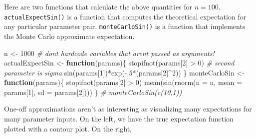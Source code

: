 \documentclass[
  12pt,
  krantz2]{krantz}
\makeatletter
\newenvironment{Shaded}{\begin{snugshade}}{\end{snugshade}}
\newcommand{\AttributeTok}[1]{\textcolor[rgb]{0.61,0.61,0.61}{#1}}
\newcommand{\CommentTok}[1]{\textcolor[rgb]{0.37,0.37,0.37}{\textit{#1}}}
\newcommand{\ControlFlowTok}[1]{\textcolor[rgb]{0.27,0.27,0.27}{\textbf{#1}}}
\newcommand{\DecValTok}[1]{\textcolor[rgb]{0.06,0.06,0.06}{#1}}
\newcommand{\FunctionTok}[1]{\textcolor[rgb]{0,0,0}{#1}}
\newcommand{\NormalTok}[1]{#1}
\newcommand{\OtherTok}[1]{\textcolor[rgb]{0.37,0.37,0.37}{#1}}
\newcommand{\SpecialCharTok}[1]{\textcolor[rgb]{0,0,0}{#1}}
\newenvironment{kframe}{%
\medskip{}
\setlength{\fboxsep}{.8em}
 \def\at@end@of@kframe{}%
 \ifinner\ifhmode%
  \def\at@end@of@kframe{\end{minipage}}%
  \begin{minipage}{\columnwidth}%
 \fi\fi%
 \def\FrameCommand##1{\hskip\@totalleftmargin \hskip-\fboxsep
 \colorbox{shadecolor}{##1}\hskip-\fboxsep
     \hskip-\linewidth \hskip-\@totalleftmargin \hskip\columnwidth}%
 \MakeFramed {\advance\hsize-\width
   \@totalleftmargin\z@ \linewidth\hsize
   \@setminipage}}%
 {\par\unskip\endMakeFramed%
 \at@end@of@kframe}
\renewenvironment{Shaded}{\begin{kframe}}{\end{kframe}}
\makeatother
\begin{document}
Here are two functions that calculate the above quantities for \(n=100\). \texttt{actualExpectSin()} is a function that computes the theoretical expectation for any particular parameter pair. \texttt{monteCarloSin()} is a function that implements the Monte Carlo approximate expectation.

\begin{Shaded}
\begin{Highlighting}[]
\NormalTok{n }\OtherTok{\textless{}{-}} \DecValTok{1000} \CommentTok{\# don\textquotesingle{}t hardcode variables that aren\textquotesingle{}t passed as arguments!}
\NormalTok{actualExpectSin }\OtherTok{\textless{}{-}} \ControlFlowTok{function}\NormalTok{(params)\{}
  \FunctionTok{stopifnot}\NormalTok{(params[}\DecValTok{2}\NormalTok{] }\SpecialCharTok{\textgreater{}} \DecValTok{0}\NormalTok{) }\CommentTok{\# second parameter is sigma}
  \FunctionTok{sin}\NormalTok{(params[}\DecValTok{1}\NormalTok{])}\SpecialCharTok{*}\FunctionTok{exp}\NormalTok{(}\SpecialCharTok{{-}}\NormalTok{.}\DecValTok{5}\SpecialCharTok{*}\NormalTok{(params[}\DecValTok{2}\NormalTok{]}\SpecialCharTok{\^{}}\DecValTok{2}\NormalTok{))}
\NormalTok{\}}
\NormalTok{monteCarloSin }\OtherTok{\textless{}{-}} \ControlFlowTok{function}\NormalTok{(params)\{}
  \FunctionTok{stopifnot}\NormalTok{(params[}\DecValTok{2}\NormalTok{] }\SpecialCharTok{\textgreater{}} \DecValTok{0}\NormalTok{) }
  \FunctionTok{mean}\NormalTok{(}\FunctionTok{sin}\NormalTok{(}\FunctionTok{rnorm}\NormalTok{(}\AttributeTok{n =}\NormalTok{ n, }\AttributeTok{mean =}\NormalTok{ params[}\DecValTok{1}\NormalTok{], }\AttributeTok{sd =}\NormalTok{ params[}\DecValTok{2}\NormalTok{])))}
\NormalTok{\}}
\CommentTok{\# monteCarloSin(c(10,1))}
\end{Highlighting}
\end{Shaded}

One-off approximations aren't as interesting as visualizing many expectations for many parameter inputs. On the left, we have the true expectation function plotted with a contour plot. On the right,
\end{document}
